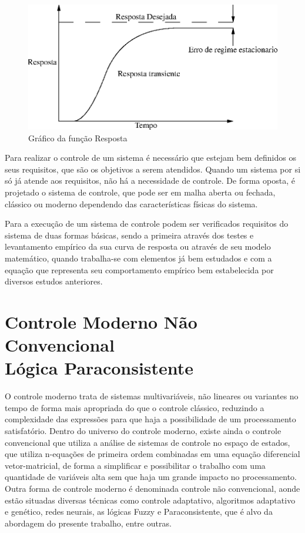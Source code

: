 \begin{figure}[!htb]
\center\includegraphics[scale=1]{./pic/C400grafico.eps}
\caption{Gráfico da função Resposta}
\label{fig:funcaoResposta}
\end{figure}

Para realizar o controle de um sistema é necessário que estejam bem definidos os seus requisitos, que são os objetivos a serem atendidos. Quando um sistema por si só já atende aos requisitos, não há a necessidade de controle. De forma oposta, é projetado o sistema de controle, que pode ser em malha aberta ou fechada, clássico ou moderno dependendo das características físicas do sistema. 

Para a execução de um sistema de controle podem ser verificados requisitos do sistema de duas formas básicas, sendo a primeira através dos testes e levantamento empírico da sua curva de resposta ou através de seu modelo matemático, quando trabalha-se com elementos já bem estudados e com a equação que representa seu comportamento empírico bem estabelecida por diversos estudos anteriores.



\newpage



\section{Controle Moderno Não Convencional \\ Lógica Paraconsistente}

O controle moderno trata de sistemas multivariáveis, não lineares ou variantes no tempo de forma mais apropriada do que o controle clássico, reduzindo a complexidade das expressões para que haja a possibilidade de um processamento satisfatório.
Dentro do universo do controle moderno, existe ainda o controle convencional que utiliza a análise de sistemas de controle no espaço de estados, que utiliza n-equações de primeira ordem combinadas em uma equação diferencial vetor-matricial, de forma a simplificar e possibilitar o trabalho com uma quantidade de variáveis alta sem que haja um grande impacto no processamento.  \cite{Ogata} 
Outra forma de controle moderno é denominada controle não convencional, aonde estão situadas diversas técnicas como controle adaptativo, algoritmos adaptativo e genético, redes neurais, as lógicas Fuzzy e Paraconsistente, que é alvo da abordagem do presente trabalho, entre outras.

